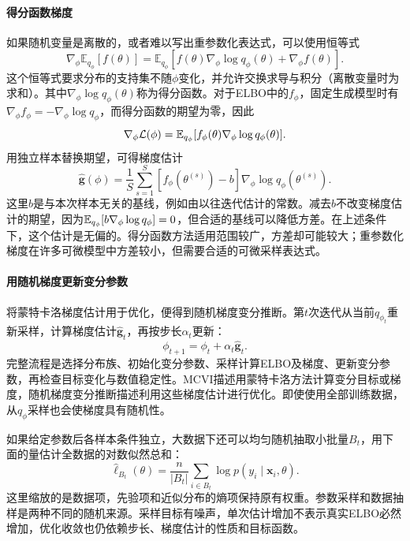 \paragraph{得分函数梯度}
如果随机变量是离散的，或者难以写出重参数化表达式，可以使用恒等式
\begin{equation}
 \nabla_\phi\mathbb E_{q_\phi}[f(\theta)]
 =\mathbb E_{q_\phi}\left[f(\theta)\nabla_\phi\log q_\phi(\theta)
 +\nabla_\phi f(\theta)\right].
 \label{eq:solving-score-function-gradient}
\end{equation}
这个恒等式要求分布的支持集不随$\phi$变化，并允许交换求导与积分（离散变量时为求和）。其中$\nabla_\phi\log q_\phi(\theta)$称为得分函数。对于ELBO中的$f_\phi$，固定生成模型时有$\nabla_\phi f_\phi=-\nabla_\phi\log q_\phi$，而得分函数的期望为零，因此
\begin{equation}
 \nabla_\phi\mathcal L(\phi)
 =\mathbb{E}_{q_\phi}[f_\phi(\theta)\nabla_\phi\log q_\phi(\theta)].
\end{equation}
用独立样本替换期望，可得梯度估计
\begin{equation}
 \widehat{\bm g}(\phi)=\frac1S\sum_{s=1}^S
 [f_\phi(\theta^{(s)})-b]\nabla_\phi\log q_\phi(\theta^{(s)}).
\end{equation}
这里$b$是与本次样本无关的基线，例如由以往迭代估计的常数。减去$b$不改变梯度估计的期望，因为$\mathbb{E}_{q_\phi}[b\nabla_\phi\log q_\phi]=0$，但合适的基线可以降低方差。在上述条件下，这个估计是无偏的。得分函数方法适用范围较广，方差却可能较大；重参数化梯度在许多可微模型中方差较小，但需要合适的可微采样表达式。

\paragraph{用随机梯度更新变分参数}
将蒙特卡洛梯度估计用于优化，便得到随机梯度变分推断。第$t$次迭代从当前$q_{\phi_t}$重新采样，计算梯度估计$\widehat{\bm g}_t$，再按步长$\alpha_t$更新：
\begin{equation}
 \phi_{t+1}=\phi_t+\alpha_t\widehat{\bm g}_t.
\end{equation}
完整流程是选择分布族、初始化变分参数、采样计算ELBO及梯度、更新变分参数，再检查目标变化与数值稳定性。MCVI描述用蒙特卡洛方法计算变分目标或梯度，随机梯度变分推断描述利用这些梯度估计进行优化。即使使用全部训练数据，从$q_\phi$采样也会使梯度具有随机性。

如果给定参数后各样本条件独立，大数据下还可以均匀随机抽取小批量$B_t$，用下面的量估计全数据的对数似然总和：
\begin{equation}
 \widehat\ell_{B_t}(\theta)
 =\frac{n}{|B_t|}\sum_{i\in B_t}\log p(y_i\mid\bm x_i,\theta).
\end{equation}
这里缩放的是数据项，先验项和近似分布的熵项保持原有权重。参数采样和数据抽样是两种不同的随机来源。采样目标有噪声，单次估计增加不表示真实ELBO必然增加，优化收敛也仍依赖步长、梯度估计的性质和目标函数。

